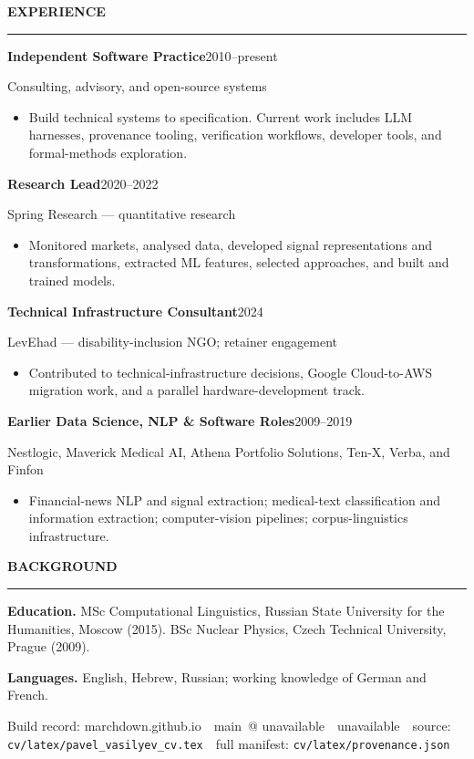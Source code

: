 \documentclass[10.5pt,a4paper]{article}
\newcommand{\cvsection}[1]{%
  \vspace{7pt}%
  {\small\bfseries\MakeUppercase{#1}}\par
  \vspace{2.5pt}\hrule\vspace{3.5pt}%
}
\newcommand{\cvrole}[4]{%
  \textbf{#1}\hfill {\small #3}\par
  {\small\color{muted}#2}\par
  \begin{itemize}#4\end{itemize}%
}
\def\CvProjectName{marchdown.github.io}%
\def\CvGitBranch{main}%
\def\CvShortCommit{unavailable}%
\def\CvGeneratedDate{unavailable}%
\def\CvManifestPath{cv/latex/provenance.json}%
\begin{document}
\cvsection{Experience}
\cvrole{Independent Software Practice}{Consulting, advisory, and open-source systems}{2010--present}{%
  \item Build technical systems to specification. Current work includes LLM harnesses, provenance tooling, verification workflows, developer tools, and formal-methods exploration.
}
\cvrole{Research Lead}{Spring Research --- quantitative research}{2020--2022}{%
  \item Monitored markets, analysed data, developed signal representations and transformations, extracted ML features, selected approaches, and built and trained models.
}
\cvrole{Technical Infrastructure Consultant}{LevEhad --- disability-inclusion NGO; retainer engagement}{2024}{%
  \item Contributed to technical-infrastructure decisions, Google Cloud-to-AWS migration work, and a parallel hardware-development track.
}
\cvrole{Earlier Data Science, NLP \& Software Roles}{Nestlogic, Maverick Medical AI, Athena Portfolio Solutions, Ten-X, Verba, and Finfon}{2009--2019}{%
  \item Financial-news NLP and signal extraction; medical-text classification and information extraction; computer-vision pipelines; corpus-linguistics infrastructure.
}

\cvsection{Background}
\textbf{Education.} MSc Computational Linguistics, Russian State University for the Humanities, Moscow (2015). \enspace BSc Nuclear Physics, Czech Technical University, Prague (2009).\par
\vspace{2pt}
\textbf{Languages.} English, Hebrew, Russian; working knowledge of German and French.

\vfill
\vspace{4pt}
{\scriptsize\color{muted}Build record: \CvProjectName\ \textbar\ \CvGitBranch\ @ \CvShortCommit\ \textbar\ \CvGeneratedDate\ \textbar\ source: \texttt{cv/latex/pavel\_vasilyev\_cv.tex}\ \textbar\ full manifest: \texttt{\CvManifestPath}}
\end{document}
